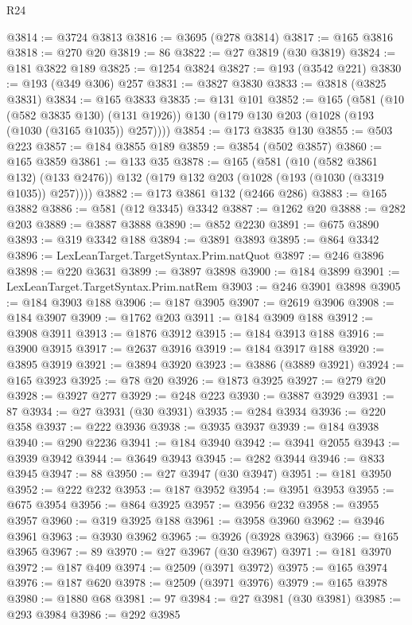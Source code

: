\begin{lexlean}{R24}
\begin{coremodule}
@3814 := @3724 @3813
@3816 := @3695 (@278 @3814)
@3817 := @165 @3816
@3818 := @270 @20
@3819 := 86
@3822 := @27 @3819 (@30 @3819)
@3824 := @181 @3822 @189
@3825 := @1254 @3824
@3827 := @193 (@3542 @221)
@3830 := @193 (@349 @306) @257
@3831 := @3827 @3830
@3833 := @3818 (@3825 @3831)
@3834 := @165 @3833
@3835 := @131 @101
@3852 := @165
    (@581
      (@10 (@582 @3835 @130) (@131 @1926))
      @130
      (@179 @130 @203 (@1028 (@193 (@1030 (@3165 @1035)) @257))))
@3854 := @173 @3835 @130
@3855 := @503 @223
@3857 := @184 @3855 @189
@3859 := @3854 (@502 @3857)
@3860 := @165 @3859
@3861 := @133 @35
@3878 := @165
    (@581
      (@10 (@582 @3861 @132) (@133 @2476))
      @132
      (@179 @132 @203 (@1028 (@193 (@1030 (@3319 @1035)) @257))))
@3882 := @173 @3861 @132 (@2466 @286)
@3883 := @165 @3882
@3886 := @581 (@12 @3345) @3342
@3887 := @1262 @20
@3888 := @282 @203
@3889 := @3887 @3888
@3890 := @852 @2230
@3891 := @675 @3890
@3893 := @319 @3342 @188
@3894 := @3891 @3893
@3895 := @864 @3342
@3896 := LexLeanTarget.TargetSyntax.Prim.natQuot
@3897 := @246 @3896
@3898 := @220 @3631
@3899 := @3897 @3898
@3900 := @184 @3899
@3901 := LexLeanTarget.TargetSyntax.Prim.natRem
@3903 := @246 @3901 @3898
@3905 := @184 @3903 @188
@3906 := @187 @3905
@3907 := @2619 @3906
@3908 := @184 @3907
@3909 := @1762 @203
@3911 := @184 @3909 @188
@3912 := @3908 @3911
@3913 := @1876 @3912
@3915 := @184 @3913 @188
@3916 := @3900 @3915
@3917 := @2637 @3916
@3919 := @184 @3917 @188
@3920 := @3895 @3919
@3921 := @3894 @3920
@3923 := @3886 (@3889 @3921)
@3924 := @165 @3923
@3925 := @78 @20
@3926 := @1873 @3925
@3927 := @279 @20
@3928 := @3927 @277
@3929 := @248 @223
@3930 := @3887 @3929
@3931 := 87
@3934 := @27 @3931 (@30 @3931)
@3935 := @284 @3934
@3936 := @220 @358
@3937 := @222 @3936
@3938 := @3935 @3937
@3939 := @184 @3938
@3940 := @290 @2236
@3941 := @184 @3940
@3942 := @3941 @2055
@3943 := @3939 @3942
@3944 := @3649 @3943
@3945 := @282 @3944
@3946 := @833 @3945
@3947 := 88
@3950 := @27 @3947 (@30 @3947)
@3951 := @181 @3950
@3952 := @222 @232
@3953 := @187 @3952
@3954 := @3951 @3953
@3955 := @675 @3954
@3956 := @864 @3925
@3957 := @3956 @232
@3958 := @3955 @3957
@3960 := @319 @3925 @188
@3961 := @3958 @3960
@3962 := @3946 @3961
@3963 := @3930 @3962
@3965 := @3926 (@3928 @3963)
@3966 := @165 @3965
@3967 := 89
@3970 := @27 @3967 (@30 @3967)
@3971 := @181 @3970
@3972 := @187 @409
@3974 := @2509 (@3971 @3972)
@3975 := @165 @3974
@3976 := @187 @620
@3978 := @2509 (@3971 @3976)
@3979 := @165 @3978
@3980 := @1880 @68
@3981 := 97
@3984 := @27 @3981 (@30 @3981)
@3985 := @293 @3984
@3986 := @292 @3985

\end{coremodule}
\end{lexlean}
